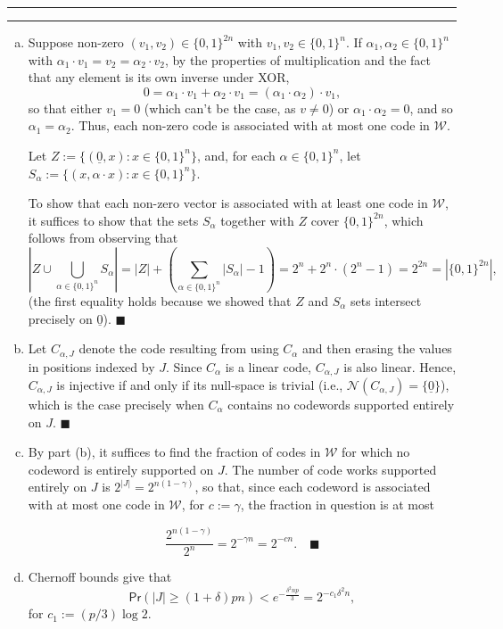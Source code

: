 \documentclass[11pt]{article}
\newcounter{questionCounter}
\newcounter{partCounter}[questionCounter]
\newenvironment{question}[2][\arabic{questionCounter}]{%
    \setcounter{partCounter}{0}%
    \vspace{.25in} \hrule \vspace{0.5em}%
        \noindent{\bf #2}%
    \vspace{0.8em} \hrule \vspace{.10in}%
    \addtocounter{questionCounter}{1}%
}{}
\renewcommand{\qed}{\quad $\blacksquare$}
\newcommand{\mqed}{\quad \blacksquare}
\newcommand{\ul}{\underline}
\newcommand{\Nul}{\mathcal{N}} %
\newcommand{\pr}[1]{\mathsf{Pr}\left( #1 \right)} %
\begin{document}
\begin{question}{Problem 4}
\begin{enumerate}[(a)]
\item Suppose non-zero $(v_1,v_2) \in \{0,1\}^{2n}$ with
$v_1,v_2 \in \{0,1\}^n$. If $\alpha_1,\alpha_2 \in \{0,1\}^n$ with
$\alpha_1 \cdot v_1 = v_2 = \alpha_2 \cdot v_2$, by the properties of
multiplication and the fact that any element is its own inverse under XOR,
\[0
    = \alpha_1 \cdot v_1 + \alpha_2 \cdot v_1
    = (\alpha_1 \cdot \alpha_2) \cdot v_1,
\]
so that either $v_1 = 0$ (which can't be the case, as $v \neq 0$) or
$\alpha_1 \cdot \alpha_2 = 0$, and so $\alpha_1 = \alpha_2$. Thus, each
non-zero code is associated with at most one code in $\mathcal{W}$.

Let $Z := \{(\ul 0,x) : x \in \{0,1\}^n\}$, and, for each
$\alpha \in \{0,1\}^n$, let
$S_{\alpha} := \{(x,\alpha \cdot x) : x \in \{0,1\}^n\}$.

To show that each non-zero vector is associated with at least one code in
$\mathcal{W}$, it suffices to show that the sets $S_{\alpha}$ together with $Z$
cover $\{0,1\}^{2n}$, which follows from observing that
\[\left| Z \cup \bigcup_{\alpha \in \{0,1\}^n} S_{\alpha} \right|
    = |Z| + \left( \sum_{\alpha \in \{0,1\}^n} |S_{\alpha}| - 1 \right)
    = 2^n + 2^n \cdot (2^n - 1)
    = 2^{2n}
    = |\{0,1\}^{2n}|,
\]
(the first equality holds because we showed that $Z$ and $S_{\alpha}$ sets
intersect precisely on $\ul 0$).
\qed

\item Let $C_{\alpha,J}$ denote the code resulting from using $C_{\alpha}$ and
then erasing the values in positions indexed by $J$. Since $C_{\alpha}$ is a
linear code, $C_{\alpha,J}$ is also linear. Hence, $C_{\alpha,J}$ is injective
if and only if its null-space is trivial (i.e.,
$\Nul(C_{\alpha,J}) = \{\ul 0\}$), which is the case precisely when
$C_{\alpha}$ contains no codewords supported entirely on $J$. \qed

\item By part (b), it suffices to find the fraction of codes in $\mathcal{W}$
for which no codeword is entirely supported on $J$. The number of code works
supported entirely on $J$ is $2^{|J|} = 2^{n(1 - \gamma)}$, so that, since each
codeword is associated with at most one code in $\mathcal{W}$, for
$c := \gamma$, the fraction in question is at most

\[\frac{2^{n(1 - \gamma)}}{2^n}
    = 2^{-\gamma n}
    = 2^{-c n}. \mqed
\]

\item Chernoff bounds give that
\[\pr{|J| \geq (1 + \delta) pn}
    < e^{-\frac{\delta^2 np}{3}}
    = 2^{-c_1\delta^2 n},\]
for $c_1 := (p/3) \log 2$.


\end{enumerate}
\end{question}
\end{document}
